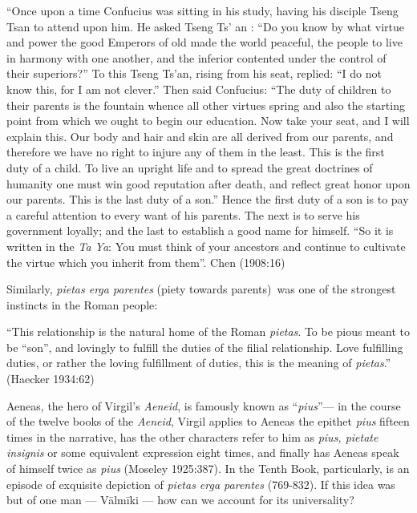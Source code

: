 \begin{myquote}
“Once upon a time Confucius was sitting in his study, having his disciple Tseng Tsan to attend upon him. He asked Tseng Ts' an : “Do you know by what virtue and power the good Emperors of old made the world peaceful, the people to live in harmony with one another, and the inferior contented under the control of their superiors?” To this Tseng Ts'an, rising from his seat, replied: “I do not know this, for I am not clever.” Then said Confucius: “The duty of children to their parents is the fountain whence all other virtues spring and also the starting point from which we ought to begin our education. Now take your seat, and I will explain this. Our body and hair and skin are all derived from our parents, and therefore we have no right to injure any of them in the least. This is the first duty of a child. To live an upright life and to spread the great doctrines of humanity one must win good reputation after death, and reflect great honor upon our parents. This is the last duty of a son.” Hence the first duty of a son is to pay a careful attention to every want of his parents. The next is to serve his government loyally; and the last to establish a good name for himself. “So it is written in the {\sl Ta Ya}: You must think of your ancestors and continue to cultivate the virtue which you inherit from them”.
\hfill Chen (1908:16)	 
\end{myquote}

Similarly, {\sl pietas erga parentes} (piety towards parents) was one of the strongest instincts in the Roman people:  

\begin{myquote}
“This relationship is the natural home of the Roman {\sl pietas}. To be pious meant to be “son”, and lovingly to fulfill the duties of the filial relationship. Love fulfilling duties, or rather the loving fulfillment of duties, this is the meaning of {\sl pietas}.”
\hfill (Haecker 1934:62)
\end{myquote}

Aeneas, the hero of Virgil’s {\sl Aeneid}, is famously known as “{\sl pius}”--- in the course of the twelve books of the {\sl Aeneid}, Virgil applies to Aeneas the epithet {\sl pius} fifteen times in the narrative, has the other characters refer to him as {\sl pius, pietate insignis} or some equivalent expression eight times, and finally has Aeneas speak of himself twice as {\sl pius} (Moseley 1925:387). In the Tenth Book, particularly, is an episode of exquisite depiction of {\sl pietas erga parentes} (769-832). If this idea was but of one man --- Vālmīki --- how can we account for its universality? 

